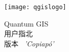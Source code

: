 
\begin{titlepage}
\begin{center}

\begin{center}
\texttt{[image: qgislogo]} 
\end{center}

\Huge{Quantum GIS}\\
\vspace{0.5cm}
\Large{用户指北} \\
\vspace{0.5cm}
\Large{版本 ~\CURRENT \textsl{'Copiapó'}}

\end{center}
\end{titlepage}
